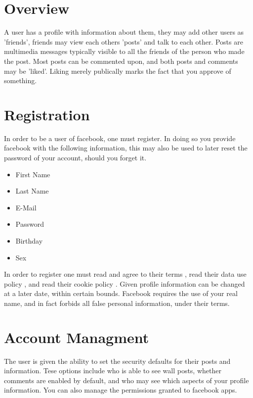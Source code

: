 \section{Overview}
A user has a profile with information about them, they may add other users as
'friends', friends may view each others 'posts' and talk to each other. Posts
are multimedia messages typically visible to all the friends of the person who
made the post. Most posts can be commented upon, and both posts and comments may
be 'liked'. Liking merely publically marks the fact that you approve of
something.

\section{Registration}
In order to be a user of facebook, one must register. In doing so you provide
facebook with the following information, this may also be used to later reset
the password of your account, should you forget it.

\begin{itemize}
\item First Name
\item Last Name
\item E-Mail
\item Password
\item Birthday
\item Sex
\end{itemize}

In order to register one must read and agree to their terms \cite{fbterms}, read
their data use policy \cite{fbdatause}, and read their cookie policy
\cite{fbcookies}.
Given profile information can be changed at a later date, within certain bounds.
Facebook requires the use of your real name, and in fact forbids all false
personal information, under their terms.\cite{fbterms, 4.1}

\section{Account Managment}
The user is given the ability to set the security defaults for their posts and
information. Tese options include who is able to see wall posts, whether
comments are enabled by default, and who may see which aspects of your profile
information. You can also manage the permissions granted to facebook apps.

